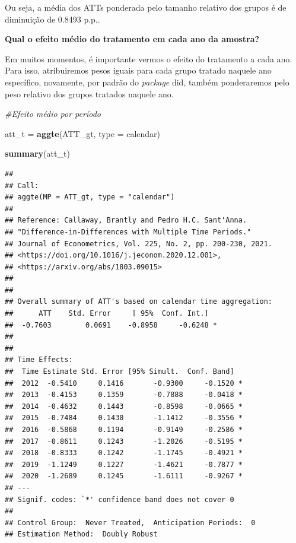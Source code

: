 \documentclass[portugues]{article}
\newenvironment{Shaded}{\begin{snugshade}}{\end{snugshade}}
\newcommand{\AttributeTok}[1]{\textcolor[rgb]{0.13,0.29,0.53}{#1}}
\newcommand{\CommentTok}[1]{\textcolor[rgb]{0.56,0.35,0.01}{\textit{#1}}}
\newcommand{\FunctionTok}[1]{\textcolor[rgb]{0.13,0.29,0.53}{\textbf{#1}}}
\newcommand{\NormalTok}[1]{#1}
\newcommand{\OtherTok}[1]{\textcolor[rgb]{0.56,0.35,0.01}{#1}}
\newcommand{\StringTok}[1]{\textcolor[rgb]{0.31,0.60,0.02}{#1}}
\begin{document}
Ou seja, a média dos ATTs ponderada pelo tamanho relativo dos grupos é de diminuição de 0.8493 p.p..  

\vspace{3mm}

\textbf{Qual o efeito médio do tratamento em cada ano da amostra?}

\vspace{3mm}

Em muitos momentos, é importante vermos o efeito do tratamento a cada ano. Para isso, atribuiremos pesos iguais para cada grupo tratado naquele ano específico, novamente, por padrão do \textit{package} did, também ponderaremos pelo peso relativo dos grupos tratados naquele ano.

\begin{box_code}

\begin{Shaded}
\begin{Highlighting}[]
\CommentTok{\#Efeito médio por período}

\NormalTok{att\_t }\OtherTok{=} \FunctionTok{aggte}\NormalTok{(ATT\_gt, }\AttributeTok{type =} \StringTok{\textquotesingle{}calendar\textquotesingle{}}\NormalTok{)}

\FunctionTok{summary}\NormalTok{(att\_t)}
\end{Highlighting}
\end{Shaded}

\begin{verbatim}
## 
## Call:
## aggte(MP = ATT_gt, type = "calendar")
## 
## Reference: Callaway, Brantly and Pedro H.C. Sant'Anna.  
## "Difference-in-Differences with Multiple Time Periods." 
## Journal of Econometrics, Vol. 225, No. 2, pp. 200-230, 2021. 
## <https://doi.org/10.1016/j.jeconom.2020.12.001>,
## <https://arxiv.org/abs/1803.09015> 
## 
## 
## Overall summary of ATT's based on calendar time aggregation:  
##      ATT    Std. Error     [ 95%  Conf. Int.]  
##  -0.7603        0.0691    -0.8958     -0.6248 *
## 
## 
## Time Effects:
##  Time Estimate Std. Error [95% Simult.  Conf. Band]  
##  2012  -0.5410     0.1416       -0.9300     -0.1520 *
##  2013  -0.4153     0.1359       -0.7888     -0.0418 *
##  2014  -0.4632     0.1443       -0.8598     -0.0665 *
##  2015  -0.7484     0.1430       -1.1412     -0.3556 *
##  2016  -0.5868     0.1194       -0.9149     -0.2586 *
##  2017  -0.8611     0.1243       -1.2026     -0.5195 *
##  2018  -0.8333     0.1242       -1.1745     -0.4921 *
##  2019  -1.1249     0.1227       -1.4621     -0.7877 *
##  2020  -1.2689     0.1245       -1.6111     -0.9267 *
## ---
## Signif. codes: `*' confidence band does not cover 0
## 
## Control Group:  Never Treated,  Anticipation Periods:  0
## Estimation Method:  Doubly Robust
\end{verbatim}

\end{box_code}
\end{document}
